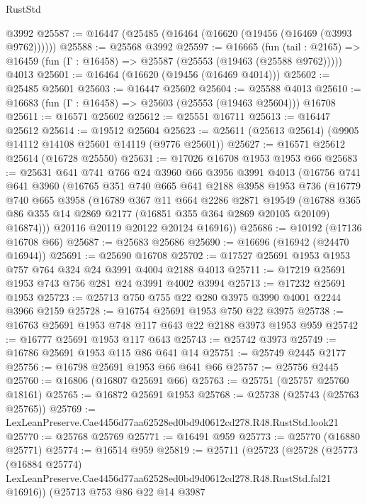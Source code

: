 \begin{lexlean}{RustStd}
\begin{coremodule}
    @3992
@25587 := @16447 (@25485 (@16464 (@16620 (@19456 (@16469 (@3993 @9762))))))
@25588 := @25568 @3992
@25597 := @16665
    (fun (tail : @2165) => @16459 (fun (Γ : @16458) => @25587 (@25553 (@19463 (@25588 @9762)))))
    @4013
@25601 := @16464 (@16620 (@19456 (@16469 @4014)))
@25602 := @25485 @25601
@25603 := @16447 @25602
@25604 := @25588 @4013
@25610 := @16683 (fun (Γ : @16458) => @25603 (@25553 (@19463 @25604))) @16708
@25611 := @16571 @25602
@25612 := @25551 @16711
@25613 := @16447 @25612
@25614 := @19512 @25604
@25623 := @25611 (@25613 @25614) (@9905 @14112 @14108 @25601 @14119 (@9776 @25601))
@25627 := @16571 @25612 @25614 (@16728 @25550)
@25631 := @17026 @16708 @1953 @1953 @66
@25683 := @25631
    @641
    @741
    @766
    @24
    @3960
    @66
    @3956
    @3991
    @4013
    (@16756
      @741
      @641
      @3960
      (@16765
        @351
        @740
        @665
        @641
        @2188
        @3958
        @1953
        @736
        (@16779
          @740
          @665
          @3958
          (@16789
            @367
            @11
            @664
            @2286
            @2871
            @19549
            (@16788 @365 @86 @355 @14 @2869 @2177 (@16851 @355 @364 @2869 @20105 @20109) @16874)))
        @20116
        @20119
        @20122
        @20124
        @16916))
@25686 := @10192 (@17136 @16708 @66)
@25687 := @25683 @25686
@25690 := @16696 (@16942 (@24470 @16944))
@25691 := @25690 @16708
@25702 := @17527 @25691 @1953 @1953 @757 @764 @324 @24 @3991 @4004 @2188 @4013
@25711 := @17219 @25691 @1953 @743 @756 @281 @24 @3991 @4002 @3994
@25713 := @17232 @25691 @1953
@25723 := @25713 @750 @755 @22 @280 @3975 @3990 @4001 @2244 @3966 @2159
@25728 := @16754 @25691 @1953 @750 @22 @3975
@25738 := @16763 @25691 @1953 @748 @117 @643 @22 @2188 @3973 @1953 @959
@25742 := @16777 @25691 @1953 @117 @643
@25743 := @25742 @3973
@25749 := @16786 @25691 @1953 @115 @86 @641 @14
@25751 := @25749 @2445 @2177
@25756 := @16798 @25691 @1953 @66 @641 @66
@25757 := @25756 @2445
@25760 := @16806 (@16807 @25691 @66)
@25763 := @25751 (@25757 @25760 @18161)
@25765 := @16872 @25691 @1953
@25768 := @25738 (@25743 (@25763 @25765))
@25769 := LexLeanPreserve.Cae4456d77aa62528ed0bd9d0612cd278.R48.RustStd.look21
@25770 := @25768 @25769
@25771 := @16491 @959
@25773 := @25770 (@16880 @25771)
@25774 := @16514 @959
@25819 := @25711
    (@25723
      (@25728
        (@25773
          (@16884 @25774)
          LexLeanPreserve.Cae4456d77aa62528ed0bd9d0612cd278.R48.RustStd.fal21
          @16916))
      (@25713
        @753
        @86
        @22
        @14
        @3987

\end{coremodule}
\end{lexlean}
